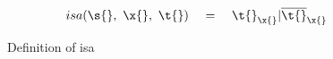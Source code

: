 \begin{figure*}
$$
\begin{array}{lclr}

\isacomparealign {\s{}} {\x{}} {\t{}}
                {\filterset {\isprop{\t{}}  {\x{}}}
                            {\notprop{\t{}} {\x{}}}}
\end{array}
$$
\caption{Definition of isa}
\end{figure*}
